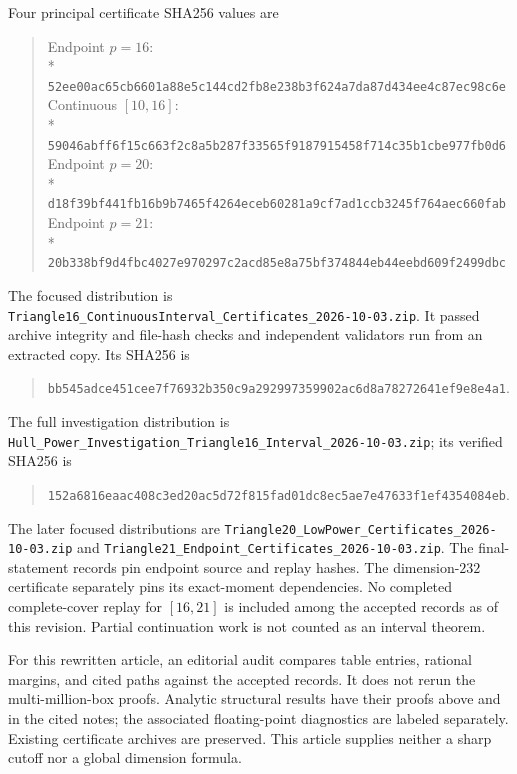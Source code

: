 \documentclass[11pt]{article}
\theoremstyle{definition}
\newcommand{\pathcode}[1]{\nolinkurl{#1}}
\begin{document}
Four principal certificate SHA256 values are
\begin{quote}\footnotesize
Endpoint $p=16$:\\*
\pathcode{52ee00ac65cb6601a88e5c144cd2fb8e238b3f624a7da87d434ee4c87ec98c6e}\\[3pt]
Continuous $[10,16]$:\\*
\pathcode{59046abff6f15c663f2c8a5b287f33565f9187915458f714c35b1cbe977fb0d6}\\[3pt]
Endpoint $p=20$:\\*
\pathcode{d18f39bf441fb16b9b7465f4264eceb60281a9cf7ad1ccb3245f764aec660fab}\\[3pt]
Endpoint $p=21$:\\*
\pathcode{20b338bf9d4fbc4027e970297c2acd85e8a75bf374844eb44eebd609f2499dbc}
\end{quote}
The focused distribution is
\pathcode{Triangle16_ContinuousInterval_Certificates_2026-10-03.zip}.
It passed archive integrity and file-hash checks and independent validators
run from an extracted copy. Its SHA256 is
\begin{quote}\footnotesize
\pathcode{bb545adce451cee7f76932b350c9a292997359902ac6d8a78272641ef9e8e4a1}.
\end{quote}
The full investigation distribution is
\pathcode{Hull_Power_Investigation_Triangle16_Interval_2026-10-03.zip};
its verified SHA256 is
\begin{quote}\footnotesize
\pathcode{152a6816eaac408c3ed20ac5d72f815fad01dc8ec5ae7e47633f1ef4354084eb}.
\end{quote}
The later focused distributions are
\pathcode{Triangle20_LowPower_Certificates_2026-10-03.zip} and
\pathcode{Triangle21_Endpoint_Certificates_2026-10-03.zip}.
The final-statement records pin endpoint source and replay hashes.
The dimension-$232$ certificate separately pins its exact-moment dependencies.
No completed complete-cover replay for $[16,21]$ is included among the
accepted records as of this revision. Partial continuation work is not
counted as an interval theorem.

For this rewritten article, an editorial audit compares table entries,
rational margins, and cited paths against the accepted records. It does
not rerun the multi-million-box proofs. Analytic structural results have
their proofs above and in the cited notes; the associated floating-point
diagnostics are labeled separately. Existing certificate archives are
preserved. This article supplies neither a sharp cutoff nor a global
dimension formula.
\end{document}
